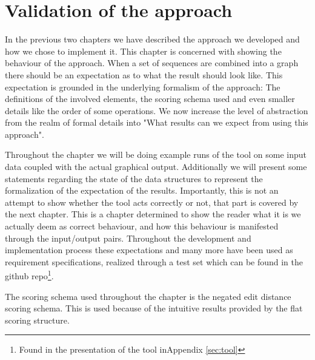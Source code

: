 \documentclass[thesis.tex]{subfiles}
\begin{document}
\chapter{Validation of the approach}
\label{sec:validation}
In the previous two chapters we have described the approach we developed and how we chose to implement it. This chapter is concerned with showing the behaviour of the approach. When a set of sequences are combined into a graph there should be an expectation as to what the result should look like. This expectation is grounded in the underlying formalism of the approach: The definitions of the involved elements, the scoring schema used and even smaller details like the order of some operations. We now increase the level of abstraction from the realm of formal details into "What results can we expect from using this approach".\\
\par\noindent
Throughout the chapter we will be doing example runs of the tool on some input data coupled with the actual graphical output. Additionally we will present some statements regarding the state of the data structures to represent the formalization of the expectation of the results. Importantly, this is not an attempt to show whether the tool acts correctly or not, that part is covered by the next chapter. This is a chapter determined to show the reader what it is we actually deem as correct behaviour, and how this behaviour is manifested through the input/output pairs. Throughout the development and implementation process these expectations and many more have been used as requirement specifications, realized through a test set which can be found in the github repo\footnote{Found in the presentation of the tool inAppendix \ref{sec:tool}}.\\
\par\noindent
The scoring schema used throughout the chapter is the negated edit distance scoring schema. This is used because of the intuitive results provided by the flat scoring structure. 
\end{document}
